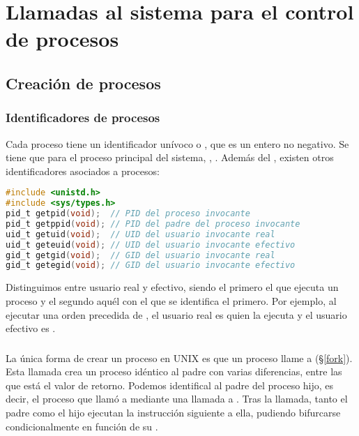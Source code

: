 \section{Llamadas al sistema para el control de procesos}

\subsection{Creación de procesos}

\subsubsection{Identificadores de procesos}

Cada proceso tiene un identificador unívoco o , que es un entero no negativo.
Se tiene que para el proceso principal del sistema, , .
Además del , existen otros identificadores asociados a procesos:

\begin{lstlisting}[language=C]
#include <unistd.h>
#include <sys/types.h>
pid_t getpid(void);  // PID del proceso invocante
pid_t getppid(void); // PID del padre del proceso invocante
uid_t getuid(void);  // UID del usuario invocante real
uid_t geteuid(void); // UID del usuario invocante efectivo
gid_t getgid(void);  // GID del usuario invocante real
gid_t getegid(void); // GID del usuario invocante efectivo
\end{lstlisting}

Distinguimos entre usuario real y efectivo, siendo el primero el que ejecuta un proceso y el segundo aquél con el que se identifica el primero.
Por ejemplo, al ejecutar una orden precedida de , el usuario real es quien la ejecuta y el usuario efectivo es .

\subsubsection{}

La única forma de crear un proceso en UNIX es que un proceso llame a  (\S\ref{fork}).
Esta llamada crea un proceso idéntico al padre con varias diferencias, entre las que está el valor de retorno.
Podemos identifical al padre del proceso hijo, es decir, el proceso que llamó a  mediante una llamada a .
Tras la llamada, tanto el padre como el hijo ejecutan la instrucción siguiente a ella, pudiendo bifurcarse condicionalmente en función de su .

